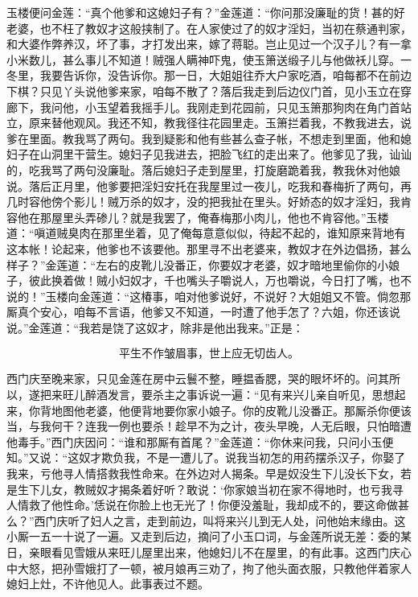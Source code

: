 玉楼便问金莲：“真个他爹和这媳妇子有？”金莲道：“你问那没廉耻的货！甚的好老婆，也不枉了教奴才这般挟制了。在人家使过了的奴才淫妇，当初在蔡通判家，和大婆作弊养汉，坏了事，才打发出来，嫁了蒋聪。岂止见过一个汉子儿？有一拿小米数儿，甚么事儿不知道！贼强人瞒神吓鬼，使玉箫送缎子儿与他做袄儿穿。一冬里，我要告诉你，没告诉你。那一日，大姐姐往乔大户家吃酒，咱每都不在前边下棋？只见丫头说他爹来家，咱每不散了？落后我走到后边仪门首，见小玉立在穿廊下，我问他，小玉望着我摇手儿。我刚走到花园前，只见玉箫那狗肉在角门首站立，原来替他观风。我还不知，教我径往花园里走。玉箫拦着我，不教我进去，说爹在里面。教我骂了两句。我到疑影和他有些甚么查子帐，不想走到里面，他和媳妇子在山洞里干营生。媳妇子见我进去，把脸飞红的走出来了。他爹见了我，讪讪的，吃我骂了两句没廉耻。落后媳妇子走到屋里，打旋磨跪着我，教我休对他娘说。落后正月里，他爹要把淫妇安托在我屋里过一夜儿，吃我和春梅折了两句，再几时容他傍个影儿！贼万杀的奴才，没的把我扯在里头。好娇态的奴才淫妇，我肯容他在那屋里头弄碜儿？就是我罢了，俺春梅那小肉儿，他也不肯容他。”玉楼道：“嗔道贼臭肉在那里坐着，见了俺每意意似似，待起不起的，谁知原来背地有这本帐！论起来，他爹也不该要他。那里寻不出老婆来，教奴才在外边倡扬，甚么样子？”金莲道：“左右的皮靴儿没番正，你要奴才老婆，奴才暗地里偷你的小娘子，彼此换着做！贼小妇奴才，千也嘴头子嚼说人，万也嚼说，今日打了嘴，也不说的！”玉楼向金莲道：“这椿事，咱对他爹说好，不说好？大姐姐又不管。倘忽那厮真个安心，咱每不言语，他爹又不知道，一时遭了他手怎了？六姐，你还该说说。”金莲道：“我若是饶了这奴才，除非是他出我来。”正是：

\[
平生不作皱眉事，世上应无切齿人。
\]

西门庆至晚来家，只见金莲在房中云鬟不整，睡揾香腮，哭的眼坏坏的。问其所以，遂把来旺儿醉酒发言，要杀主之事诉说一遍：“见有来兴儿亲自听见，思想起来，你背地图他老婆，他便背地要你家小娘子。你的皮靴儿没番正。那厮杀你便该当，与我何干？连我一例也要杀！趁早不为之计，夜头早晚，人无后眼，只怕暗遭他毒手。”西门庆因问：“谁和那厮有首尾？”金莲道：“你休来问我，只问小玉便知。”又说：“这奴才欺负我，不是一遭儿了。说我当初怎的用药摆杀汉子，你娶了我来，亏他寻人情搭救我性命来。在外边对人揭条。早是奴没生下儿没长下女，若是生下儿女，教贼奴才揭条着好听？敢说：‘你家娘当初在家不得地时，也亏我寻人情救了他性命。’恁说在你脸上也无光了！你便没羞耻，我却成不的，要这命做甚么？”西门庆听了妇人之言，走到前边，叫将来兴儿到无人处，问他始末缘由。这小厮一五一十说了一遍。又走到后边，摘问了小玉口词，与金莲所说无差：委的某日，亲眼看见雪娥从来旺儿屋里出来，他媳妇儿不在屋里，的有此事。这西门庆心中大怒，把孙雪娥打了一顿，被月娘再三劝了，拘了他头面衣服，只教他伴着家人媳妇上灶，不许他见人。此事表过不题。

